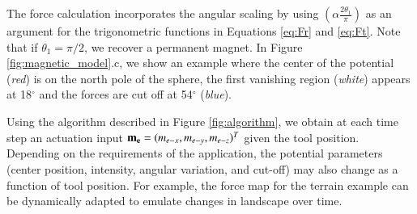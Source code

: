 The force calculation incorporates the angular scaling by using $(\alpha\frac{2\theta_1}{\pi})$ as an argument for the trigonometric functions in Equations \ref{eq:Fr} and \ref{eq:Ft}. Note that if $\theta_1 = \pi/2$, we recover a permanent magnet. In Figure \ref{fig:magnetic_model}.c, we show an example where the center of the potential (\emph{red}) is on the north pole of the sphere, the first vanishing region (\emph{white}) appears at 18$^\circ$ and the forces are cut off at 54$^\circ$ (\emph{blue}).

Using the algorithm described in Figure \ref{fig:algorithm}, we obtain at each time step an actuation input $\mathbf{m_{e}} = (m_{e-x}, m_{e-y}, m_{e-z})^T$ given the tool position. Depending on the requirements of the application, the potential parameters (center position, intensity, angular variation, and cut-off) may also change as a function of tool position. For example, the force map for the terrain example can be dynamically adapted to emulate changes in landscape over time.

